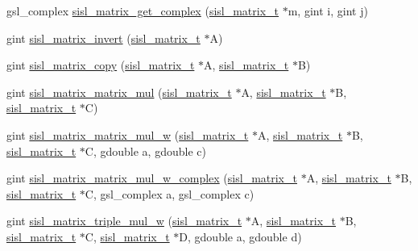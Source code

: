 \begin{DoxyCompactItemize}
gsl\+\_\+complex \mbox{\hyperlink{group__matrix_ga0a0ea595d8beec73a6673101ad348add}{sisl\+\_\+matrix\+\_\+get\+\_\+complex}} (\mbox{\hyperlink{group__matrix_gad147923587b355644defb9bfbf981740}{sisl\+\_\+matrix\+\_\+t}} $\ast$m, gint i, gint j)
\item 
gint \mbox{\hyperlink{group__matrix_ga9ebe378f73157b236e04d65d0d982864}{sisl\+\_\+matrix\+\_\+invert}} (\mbox{\hyperlink{group__matrix_gad147923587b355644defb9bfbf981740}{sisl\+\_\+matrix\+\_\+t}} $\ast$A)
\item 
gint \mbox{\hyperlink{group__matrix_ga76214ff23ddf1c1175d918868ba29b97}{sisl\+\_\+matrix\+\_\+copy}} (\mbox{\hyperlink{group__matrix_gad147923587b355644defb9bfbf981740}{sisl\+\_\+matrix\+\_\+t}} $\ast$A, \mbox{\hyperlink{group__matrix_gad147923587b355644defb9bfbf981740}{sisl\+\_\+matrix\+\_\+t}} $\ast$B)
\item 
gint \mbox{\hyperlink{group__matrix_ga4eba2be7655e4f1b1845709f27994445}{sisl\+\_\+matrix\+\_\+matrix\+\_\+mul}} (\mbox{\hyperlink{group__matrix_gad147923587b355644defb9bfbf981740}{sisl\+\_\+matrix\+\_\+t}} $\ast$A, \mbox{\hyperlink{group__matrix_gad147923587b355644defb9bfbf981740}{sisl\+\_\+matrix\+\_\+t}} $\ast$B, \mbox{\hyperlink{group__matrix_gad147923587b355644defb9bfbf981740}{sisl\+\_\+matrix\+\_\+t}} $\ast$C)
\item 
gint \mbox{\hyperlink{group__matrix_ga1b38f4144079da23373564e920652425}{sisl\+\_\+matrix\+\_\+matrix\+\_\+mul\+\_\+w}} (\mbox{\hyperlink{group__matrix_gad147923587b355644defb9bfbf981740}{sisl\+\_\+matrix\+\_\+t}} $\ast$A, \mbox{\hyperlink{group__matrix_gad147923587b355644defb9bfbf981740}{sisl\+\_\+matrix\+\_\+t}} $\ast$B, \mbox{\hyperlink{group__matrix_gad147923587b355644defb9bfbf981740}{sisl\+\_\+matrix\+\_\+t}} $\ast$C, gdouble a, gdouble c)
\item 
gint \mbox{\hyperlink{group__matrix_ga2a471c9616271db2f9ee139c9fe81969}{sisl\+\_\+matrix\+\_\+matrix\+\_\+mul\+\_\+w\+\_\+complex}} (\mbox{\hyperlink{group__matrix_gad147923587b355644defb9bfbf981740}{sisl\+\_\+matrix\+\_\+t}} $\ast$A, \mbox{\hyperlink{group__matrix_gad147923587b355644defb9bfbf981740}{sisl\+\_\+matrix\+\_\+t}} $\ast$B, \mbox{\hyperlink{group__matrix_gad147923587b355644defb9bfbf981740}{sisl\+\_\+matrix\+\_\+t}} $\ast$C, gsl\+\_\+complex a, gsl\+\_\+complex c)
\item 
gint \mbox{\hyperlink{group__matrix_gaf23a4fdd6ccbcc355f2e48ccf12deed4}{sisl\+\_\+matrix\+\_\+triple\+\_\+mul\+\_\+w}} (\mbox{\hyperlink{group__matrix_gad147923587b355644defb9bfbf981740}{sisl\+\_\+matrix\+\_\+t}} $\ast$A, \mbox{\hyperlink{group__matrix_gad147923587b355644defb9bfbf981740}{sisl\+\_\+matrix\+\_\+t}} $\ast$B, \mbox{\hyperlink{group__matrix_gad147923587b355644defb9bfbf981740}{sisl\+\_\+matrix\+\_\+t}} $\ast$C, \mbox{\hyperlink{group__matrix_gad147923587b355644defb9bfbf981740}{sisl\+\_\+matrix\+\_\+t}} $\ast$D, gdouble a, gdouble d)

\end{DoxyCompactItemize}
